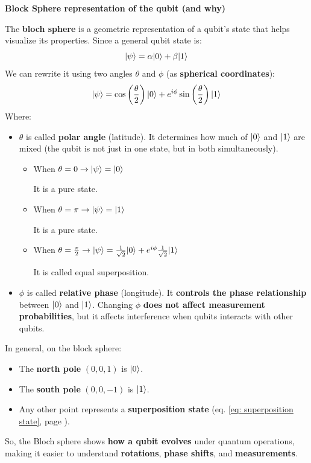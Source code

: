 \begin{flushleft}
    \textcolor{Green3}{ \textbf{Block Sphere representation of the qubit (and why)}}
\end{flushleft}
The \textbf{bloch sphere} is a geometric representation of a qubit's state that helps visualize its properties. Since a general qubit state is:
\begin{equation*}
    | \psi \rangle = \alpha| 0 \rangle + \beta| 1 \rangle
\end{equation*}
We can rewrite it using two angles $\theta$ and $\phi$ (as \textbf{spherical coordinates}):
\begin{equation}\label{eq: superposition state}
    | \psi \rangle = \cos\left(\dfrac{\theta}{2}\right) | 0 \rangle + e^{i\phi} \sin\left(\dfrac{\theta}{2}\right) | 1 \rangle
\end{equation}
Where:
\begin{itemize}
    \item $\theta$ is called \textbf{polar angle} (latitude). It determines how much of $| 0 \rangle$ and $| 1 \rangle$ are mixed (the qubit is not just in one state, but in both simultaneously).
    \begin{itemize}
        \item When $\theta = 0 \rightarrow | \psi \rangle = | 0 \rangle$

        It is a pure state.
        \item When $\theta = \pi \rightarrow | \psi \rangle = | 1 \rangle$

        It is a pure state.
        \item When $\theta = \frac{\pi}{2} \rightarrow | \psi \rangle = \frac{1}
        {\sqrt{2}}| 0 \rangle + e^{i\phi} \frac{1}{\sqrt{2}}| 1 \rangle$

        It is called equal superposition.
    \end{itemize}
    \item $\phi$ is called \textbf{relative phase} (longitude). It \textbf{controls the phase relationship} between $| 0 \rangle$ and $| 1 \rangle$. Changing $\phi$ \textbf{does not affect measurement probabilities}, but it affects interference when qubits interacts with other qubits.
\end{itemize}
In general, on the block sphere:
\begin{itemize}
    \item The \textbf{north pole} $\left(0,0,1\right)$ is $| 0 \rangle$.
    \item The \textbf{south pole} $\left(0,0,-1\right)$ is $| 1 \rangle$.
    \item Any other point represents a \textbf{superposition state} (eq. \ref{eq: superposition state}, page \pageref{eq: superposition state}).

\end{itemize}
So, the Bloch sphere shows \textbf{how a qubit evolves} under quantum operations, making it easier to understand \textbf{rotations}, \textbf{phase shifts}, and \textbf{measurements}.

